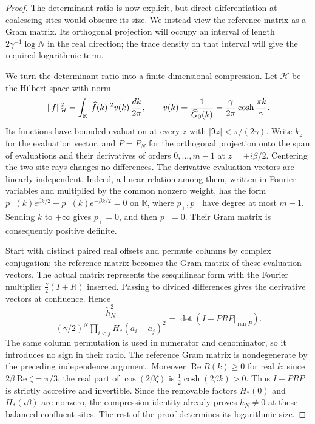 \begin{proof}
The determinant ratio is now explicit, but direct differentiation at
coalescing sites would obscure its size. We instead view the reference
matrix as a Gram matrix. Its orthogonal projection will occupy an
interval of length $2\gamma^{-1}\log N$ in the real direction; the
trace density on that interval will give the required logarithmic term.

We turn the determinant ratio into a finite-dimensional compression.
Let $\mathcal H$ be the Hilbert space with norm
\[
 \|f\|_{\mathcal H}^2
 =\int_\mathbb R|\widehat f(k)|^2v(k)\,\frac{dk}{2\pi},\qquad
 v(k)=\frac1{\widehat G_0(k)}
      =\frac\gamma{2\pi}\cosh\frac{\pi k}{\gamma}.
\]
Its functions have bounded evaluation at every
$z$ with $|\Im z|<\pi/(2\gamma)$. Write $k_z$ for the evaluation
vector, and $P=P_N$ for the orthogonal projection onto the span of
evaluations and their derivatives of orders $0,\ldots,m-1$ at
$z=\pm i\beta/2$. Centering the two site rays changes no differences. The derivative
evaluation vectors are linearly independent. Indeed, a linear relation
among them, written in Fourier variables and multiplied by the common
nonzero weight, has the form
$p_+(k)e^{\beta k/2}+p_-(k)e^{-\beta k/2}=0$ on $\mathbb R$, where
$p_+,p_-$ have degree at most $m-1$. Sending $k$ to $+\infty$ gives
$p_+=0$, and then $p_-=0$. Their Gram matrix is consequently positive
definite.

Start with distinct paired real offsets and permute columns by complex
conjugation; the reference matrix becomes the Gram matrix of these
evaluation vectors. The actual matrix represents the sesquilinear form with the
Fourier multiplier $\frac\gamma2(I+R)$ inserted. Passing to divided
differences gives the derivative vectors at confluence. Hence
\begin{equation}\label{eq:02-compression-determinant}
 \frac{\widetilde h_N^2}
 {(\gamma/2)^N\prod_{i<j}H_*(a_i-a_j)^2}
 =\det\left(I+PRP\big|_{\operatorname{ran}P}\right).
\end{equation}
The same column permutation is used in numerator and denominator,
so it introduces no sign in their ratio. The reference Gram matrix is
nondegenerate by the preceding independence argument.
Moreover $\operatorname{Re}R(k)\ge0$ for real $k$: since
$2\beta\operatorname{Re}\zeta=\pi/3$, the real part of
$\cos(2\beta\zeta)$ is $\tfrac12\cosh(2\beta k)>0$.
Thus $I+PRP$ is strictly accretive and invertible. Since the removable
factors $H_*(0)$ and $H_*(i\beta)$ are nonzero, the compression identity
already proves $h_N\ne0$ at these balanced confluent sites. The rest
of the proof determines its logarithmic size.


\end{proof}
